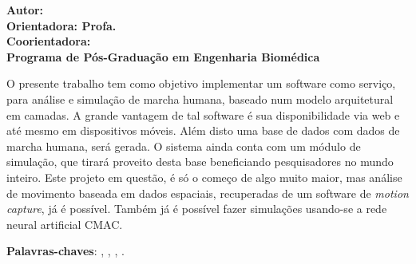 \begin{resumo}

\begin{center}
\textbf{\imprimirtitulo}
\end{center}

\begin{flushleft}
\footnotesize
\textbf{Autor: \imprimirautor }\\
\textbf{Orientadora: Profa. \imprimirorientador }\\
\textbf{Coorientadora: \imprimirmembroCoorientador} \\
\textbf{Programa de Pós-Graduação em Engenharia Biomédica} \\
\textbf{\imprimirlocal \imprimirdata }
\end{flushleft}

O presente trabalho tem como objetivo implementar um software como serviço, para análise e simulação de marcha humana, baseado num modelo arquitetural em camadas. A grande vantagem de tal software é sua disponibilidade via web e até mesmo em dispositivos móveis. Além disto uma base de dados com dados de marcha humana, será gerada. O sistema ainda conta com um módulo de simulação, que tirará proveito desta base beneficiando pesquisadores no mundo inteiro. Este projeto em questão, é só o começo de algo muito maior, mas análise de movimento baseada em dados espaciais, recuperadas de um software de \emph{motion capture}, já é possível. Também já é possível fazer simulações usando-se  a rede neural artificial CMAC.


\vspace{\onelineskip}
    
 \noindent
 \textbf{Palavras-chaves}: \imprimirpalavrachaveum, \imprimirpalavrachavedois, 
			    \imprimirpalavrachavetres, \imprimirpalavrachavequatro.
\end{resumo}

